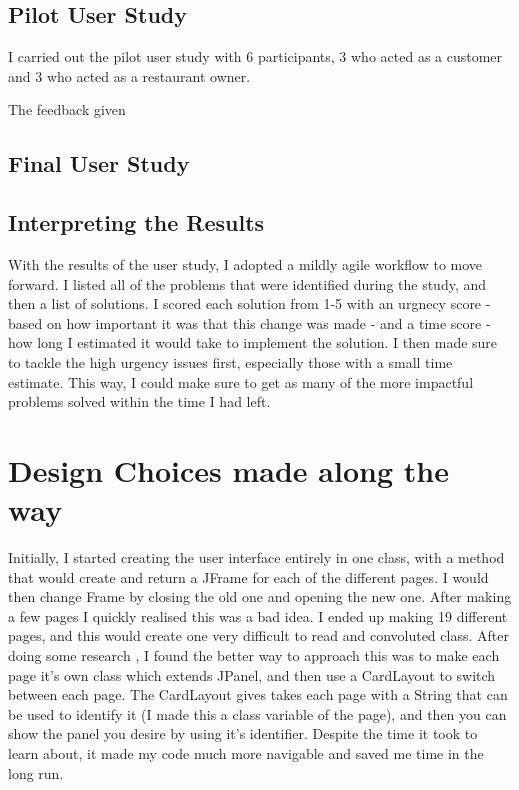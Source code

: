 \subsection{Pilot User Study}

I carried out the pilot user study with 6 participants, 3 who acted as a customer and 3 who acted as a restaurant owner. 

The feedback given 

\subsection{Final User Study}

\subsection{Interpreting the Results}

With the results of the user study, I adopted a mildly agile workflow to move forward. I listed all of the problems that were identified during the study, and then a list of solutions. I scored each solution from 1-5 with an urgnecy score - based on how important it was that this change was made - and a time score - how long I estimated it would take to implement the solution. I then made sure to tackle the high urgency issues first, especially those with a small time estimate. This way, I could make sure to get as many of the more impactful problems solved within the time I had left. 



\section{Design Choices made along the way}
Initially, I started creating the user interface entirely in one class, with a method that would create and return a JFrame for each of the different pages. I would then change Frame by closing the old one and opening the new one. After making a few pages I quickly realised this was a bad idea. I ended up making 19 different pages, and this would create one very difficult to read and convoluted class. After doing some research \cite{cardLayout}, I found the better way to approach this was to make each page it's own class which extends JPanel, and then use a CardLayout to switch between each page. The CardLayout gives takes each page with a String that can be used to identify it (I made this a class variable of the page), and then you can show the panel you desire by using it's identifier. Despite the time it took to learn about, it made my code much more navigable and saved me time in the long run.

